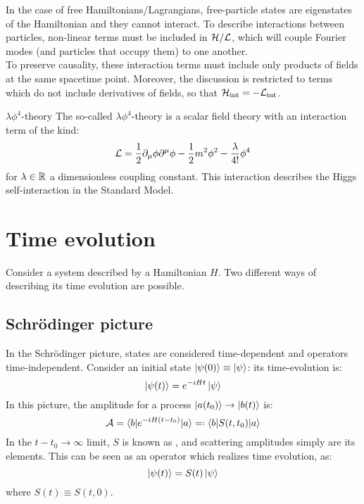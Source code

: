 
In the case of free Hamiltonians/Lagrangians, free-particle states are eigenstates of the Hamiltonian and they cannot interact. To describe interactions between particles, non-linear terms must be included in $ \mathcal{H} / \mathcal{L} $, which will couple Fourier modes (and particles that occupy them) to one another. \\
To preserve causality, these interaction terms must include only products of fields at the same spacetime point. Moreover, the discussion is restricted to terms which do not include derivatives of fields, so that $ \mathcal{H}_\text{int} = - \mathcal{L}_\text{int} $.

\begin{example}{$ \lambda \phi^4 $-theory}{}
  The so-called $ \lambda \phi^4 $-theory is a scalar field theory with an interaction term of the kind:
  \begin{equation}
    \mathcal{L} = \frac{1}{2} \partial_\mu \phi \partial^\mu \phi - \frac{1}{2} m^2 \phi^2 - \frac{\lambda}{4!} \phi^4
  \end{equation}
  for $ \lambda \in \mathbb{R} $ a dimensionless coupling constant. This interaction describes the Higgs self-interaction in the Standard Model.
\end{example}

\section{Time evolution}

Consider a system described by a Hamiltonian $ H $. Two different ways of describing its time evolution are possible.

\subsection{Schrödinger picture}

In the Schrödinger picture, states are considered time-dependent and operators time-independent. Consider an initial state $ \ket{\psi(0)} \equiv \ket{\psi} $: its time-evolution is:
\begin{equation}
  \ket{\psi(t)} = e^{-i H t} \ket{\psi}
\end{equation}
In this picture, the amplitude for a process $ \ket{a(t_0)} \rightarrow \ket{b(t)} $ is:
\begin{equation}
  \mathcal{A} = \braket{b | e^{-i H (t - t_0)} | a} \eqdef \braket{b | S(t,t_0) | a}
  \label{eq:schr-ampl}
\end{equation}
In the $ t - t_0 \rightarrow \infty $ limit, $ S $ is known as , and scattering amplitudes simply are its elements. This can be seen as an operator which realizes time evolution, as:
\begin{equation}
  \ket{\psi(t)} = S(t) \ket{\psi}
\end{equation}
where $ S(t) \equiv S(t,0) $.

